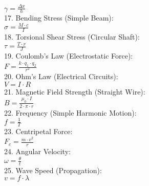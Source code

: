 \documentclass{article}
\begin{document}
\begin{multicols}{2}
    \( \gamma = \frac{\Delta x}{h} \) \\
17. Bending Stress (Simple Beam): \\
    \( \sigma = \frac{M \cdot c}{I} \) \\
18. Torsional Shear Stress (Circular Shaft): \\
    \( \tau = \frac{T \cdot r}{J} \) \\
19. Coulomb's Law (Electrostatic Force): \\
    \( F = \frac{k \cdot q_1 \cdot q_2}{r^2} \) \\
20. Ohm's Law (Electrical Circuits): \\
    \( V = I \cdot R \) \\
21. Magnetic Field Strength (Straight Wire): \\
    \( B = \frac{\mu_0 \cdot I}{2 \cdot \pi \cdot r} \) \\
22. Frequency (Simple Harmonic Motion): \\
    \( f = \frac{1}{T} \) \\
23. Centripetal Force: \\
    \( F_c = \frac{m \cdot v^2}{r} \) \\
24. Angular Velocity: \\
    \( \omega = \frac{\theta}{t} \) \\
25. Wave Speed (Propagation): \\
    \( v = f \cdot \lambda \) \\

\newpage
\vfill\eject

\end{multicols}
\end{document}
